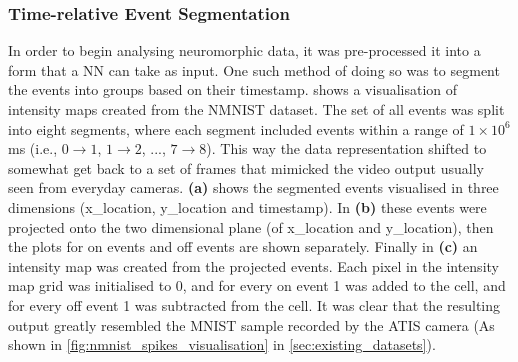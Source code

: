\subsubsection{Time-relative Event Segmentation}
In order to begin analysing neuromorphic data, it was pre-processed it into a form that a NN can take as input. One such method of doing so was to segment the events into groups based on their timestamp.  shows a visualisation of intensity maps created from the NMNIST\cite{NMNIST} dataset. The set of all events was split into eight segments, where each segment included events within a range of $ 1 \times 10^6 $ ms (i.e., $ 0 \rightarrow 1 $, $ 1 \rightarrow 2 $, ..., $ 7 \rightarrow 8 $). This way the data representation shifted to somewhat get back to a set of frames that mimicked the video output usually seen from everyday cameras. \textbf{(a)} shows the segmented events visualised in three dimensions (x\_location, y\_location and timestamp). In \textbf{(b)} these events were projected onto the two dimensional plane (of x\_location and y\_location), then the plots for on events and off events are shown separately. Finally in \textbf{(c)} an intensity map was created from the projected events. Each pixel in the intensity map grid was initialised to 0, and for every on event 1 was added to the cell, and for every off event 1 was subtracted from the cell. It was clear that the resulting output greatly resembled the MNIST\cite{MNIST} sample recorded by the ATIS camera (As shown in \cref{fig:nmnist_spikes_visualisation} in \cref{sec:existing_datasets}).

